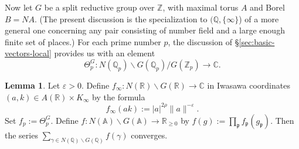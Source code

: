 \documentclass[reqno]{amsart}
\def\eps{\varepsilon}
\theoremstyle{plain} \newtheorem{theorem} {Theorem}
\theoremstyle{definition} \newtheorem{definition} [theorem] {Definition}
\theoremstyle{itplain} %
\newtheorem{lemma}[theorem]{Lemma}
\numberwithin{equation}{section}
\numberwithin{theorem}{section}
\renewcommand{\geq}{\geqslant}
\begin{document}
Now let $G$ be a split reductive group over $\mathbb{Z}$, with maximal torus $A$ and Borel $B = N A$.  (The present discussion is the specialization to $(\mathbb{Q}, \{\infty \}$) of a more general one concerning any pair consisting of number field and a large enough finite set of places.)  For each prime number $p$, the discussion of \S\ref{sec:basic-vectors-local} provides us with an element
\begin{equation*}
\Theta^G_p  : N(\mathbb{Q}_p) \backslash G(\mathbb{Q}_p) / G(\mathbb{Z}_p) \rightarrow \mathbb{C}.
\end{equation*}


\begin{lemma}\label{lem:sub-gln:let-m-in}
  Let $\eps > 0$.  Define $f_\infty : N(\mathbb{R}) \backslash G(\mathbb{R}) \rightarrow \mathbb{C}$ in Iwasawa coordinates $(a,k) \in A(\mathbb{R}) \times K_\infty$ by the formula
  \begin{equation*}
    f_\infty(a k) := |a|^{2 \rho} \|a\|^{-\eps}.
  \end{equation*}
  Set $f_p := \Theta_p^G$.  Define $f : N(\mathbb{A}) \backslash G(\mathbb{A}) \rightarrow \mathbb{R}_{\geq 0}$ by $f(g) := \prod_\mathfrak{p} f_\mathfrak{p}(g_\mathfrak{p})$.  Then the series $\sum _{\gamma \in N(\mathbb{Q}) \backslash G(\mathbb{Q})} f(\gamma)$ converges.
\end{lemma}
\end{document}
